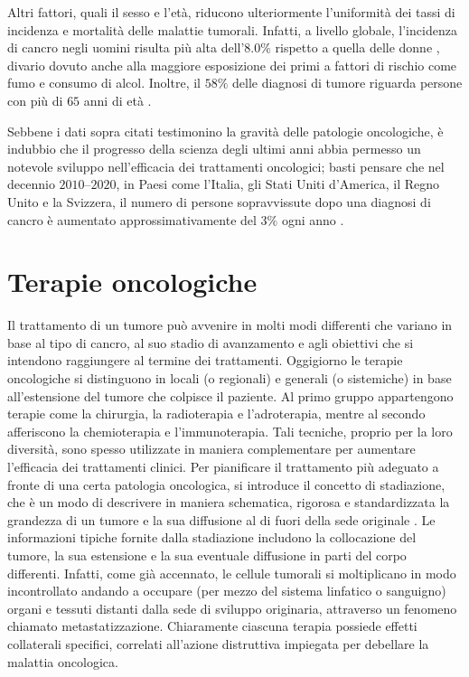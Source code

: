 \documentclass[12pt,a4paper,twoside]{report}
\begin{document}
	Altri fattori, quali il sesso e l'età, riducono ulteriormente l'uniformità dei tassi di incidenza e mortalità delle malattie tumorali. Infatti, a livello globale, l'incidenza di cancro negli uomini risulta più alta dell'$8.0\%$ rispetto a quella delle donne \cite{gco2}, divario dovuto anche alla maggiore esposizione dei primi a fattori di rischio come fumo e consumo di alcol. Inoltre, il $58\%$ delle diagnosi di tumore riguarda persone con più di $65$ anni di età \cite{uscs}.
	
	Sebbene i dati sopra citati testimonino la gravità delle patologie oncologiche, è indubbio che il progresso della scienza degli ultimi anni abbia permesso un notevole sviluppo nell'efficacia dei trattamenti oncologici; basti pensare che nel decennio $2010$--$2020$, in Paesi come l'Italia, gli Stati Uniti d'America, il Regno Unito e la Svizzera, il numero di persone sopravvissute dopo una diagnosi di cancro è aumentato approssimativamente del $3\%$ ogni anno \cite{Guzzinati2018-sf}.
	
	\section{Terapie oncologiche}\label{sec:1.2}
	Il trattamento di un tumore può avvenire in molti modi differenti che variano in base al tipo di cancro, al suo stadio di avanzamento e agli obiettivi che si intendono raggiungere al termine dei trattamenti. Oggigiorno le terapie oncologiche si distinguono in locali (o regionali) e generali (o sistemiche) in base all'estensione del tumore che colpisce il paziente. Al primo gruppo appartengono terapie come la chirurgia, la radioterapia e l'adroterapia, mentre al secondo afferiscono la chemioterapia e l'immunoterapia. Tali tecniche, proprio per la loro diversità, sono spesso utilizzate in maniera complementare per aumentare l'efficacia dei trattamenti clinici. Per pianificare il trattamento più adeguato a fronte di una certa patologia oncologica, si introduce il concetto di stadiazione, che è un modo di descrivere in maniera schematica, rigorosa e standardizzata la grandezza di un tumore e la sua diffusione al di fuori della sede originale \cite{airc}. Le informazioni tipiche fornite dalla stadiazione includono la collocazione del tumore, la sua estensione e la sua eventuale diffusione in parti del corpo differenti. Infatti, come già accennato, le cellule tumorali si moltiplicano in modo incontrollato andando a occupare (per mezzo del sistema linfatico o sanguigno) organi e tessuti distanti dalla sede di sviluppo originaria, attraverso un fenomeno chiamato metastatizzazione. Chiaramente ciascuna terapia possiede effetti collaterali specifici, correlati all'azione distruttiva impiegata per debellare la malattia oncologica.
	
\end{document}
